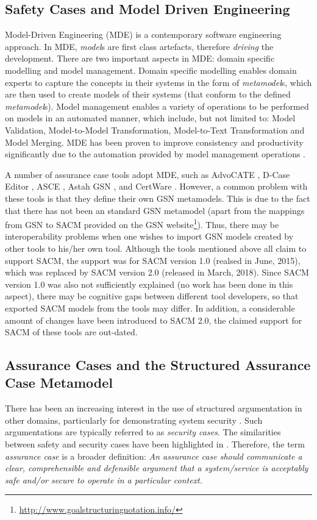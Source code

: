 \subsection{Safety Cases and Model Driven Engineering}
Model-Driven Engineering (MDE) is a contemporary software engineering approach. 
In MDE, \textit{model}s are first class artefacts, therefore \textit{driving} the development. 
There are two important aspects in MDE: domain specific modelling and model management. 
Domain specific modelling enables domain experts to capture the concepts in their systems in the form of \textit{metamodel}s, which are then used to create models of their systems (that conform to the defined \textit{metamodel}s). 
Model management enables a variety of operations to be performed on models in an automated manner, which include, but not limited to: Model Validation, Model-to-Model Transformation, Model-to-Text Transformation and Model Merging.
MDE has been proven to improve consistency and productivity significantly due to the automation provided by model management operations \cite{jaaksi2002developing, karna2009evaluating}. 

A number of assurance case tools adopt MDE, such as AdvoCATE \cite{denney2017tool}, D-Case Editor \cite{matsuno2010dependability}, ASCE \cite{netkachova2014tool}, Astah GSN \cite{larrucea2017supporting}, and CertWare \cite{barry2011certware}. 
However, a common problem with these tools is that they define their own GSN metamodels. 
This is due to the fact that there has not been an standard GSN metamodel (apart from the mappings from GSN to SACM provided on the GSN website\footnote{\url{http://www.goalstructuringnotation.info/}}).
Thus, there may be interoperability problems when one wishes to import GSN models created by other tools to his/her own tool. 
Although the tools mentioned above all claim to support SACM, the support was for SACM version 1.0 (realsed in June, 2015), which was replaced by SACM version 2.0 (released in March, 2018).
Since SACM version 1.0 was also not sufficiently explained (no work has been done in this aspect), there may be cognitive gaps between different tool developers, so that exported SACM models from the tools may differ.
In addition, a considerable amount of changes have been introduced to SACM 2.0, the claimed support for SACM of these tools are out-dated. 

\subsection{Assurance Cases and the Structured Assurance Case Metamodel}
There has been an increasing interest in the use of structured argumentation in other domains, particularly for demonstrating system security \cite{bloomfield2010safety}. 
Such argumentations are typically referred to as \textit{security cases}. 
The similarities between safety and security cases have been highlighted in \cite{lautieri2005safsec}. 
Therefore, the term \textit{assurance case} is a broader definition: \textit{An assurance case should communicate a clear, comprehensible and defensible argument that a system/service is acceptably safe and/or secure to operate in a particular context.} 

